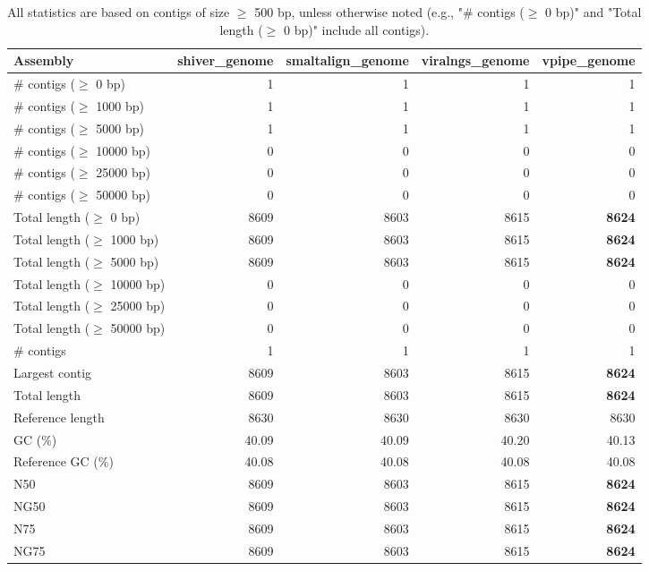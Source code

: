 \documentclass[12pt,a4paper]{article}
\begin{document}
\begin{table}[ht]
\begin{center}
\caption{All statistics are based on contigs of size $\geq$ 500 bp, unless otherwise noted (e.g., "\# contigs ($\geq$ 0 bp)" and "Total length ($\geq$ 0 bp)" include all contigs).}
\begin{tabular}{|l*{4}{|r}|}
\hline
Assembly & shiver\_genome & smaltalign\_genome & viralngs\_genome & vpipe\_genome \\ \hline
\# contigs ($\geq$ 0 bp) & 1 & 1 & 1 & 1 \\ \hline
\# contigs ($\geq$ 1000 bp) & 1 & 1 & 1 & 1 \\ \hline
\# contigs ($\geq$ 5000 bp) & 1 & 1 & 1 & 1 \\ \hline
\# contigs ($\geq$ 10000 bp) & 0 & 0 & 0 & 0 \\ \hline
\# contigs ($\geq$ 25000 bp) & 0 & 0 & 0 & 0 \\ \hline
\# contigs ($\geq$ 50000 bp) & 0 & 0 & 0 & 0 \\ \hline
Total length ($\geq$ 0 bp) & 8609 & 8603 & 8615 & {\bf 8624} \\ \hline
Total length ($\geq$ 1000 bp) & 8609 & 8603 & 8615 & {\bf 8624} \\ \hline
Total length ($\geq$ 5000 bp) & 8609 & 8603 & 8615 & {\bf 8624} \\ \hline
Total length ($\geq$ 10000 bp) & 0 & 0 & 0 & 0 \\ \hline
Total length ($\geq$ 25000 bp) & 0 & 0 & 0 & 0 \\ \hline
Total length ($\geq$ 50000 bp) & 0 & 0 & 0 & 0 \\ \hline
\# contigs & 1 & 1 & 1 & 1 \\ \hline
Largest contig & 8609 & 8603 & 8615 & {\bf 8624} \\ \hline
Total length & 8609 & 8603 & 8615 & {\bf 8624} \\ \hline
Reference length & 8630 & 8630 & 8630 & 8630 \\ \hline
GC (\%) & 40.09 & 40.09 & 40.20 & 40.13 \\ \hline
Reference GC (\%) & 40.08 & 40.08 & 40.08 & 40.08 \\ \hline
N50 & 8609 & 8603 & 8615 & {\bf 8624} \\ \hline
NG50 & 8609 & 8603 & 8615 & {\bf 8624} \\ \hline
N75 & 8609 & 8603 & 8615 & {\bf 8624} \\ \hline
NG75 & 8609 & 8603 & 8615 & {\bf 8624} \\ \hline

\end{tabular}
\end{center}
\end{table}
\end{document}
